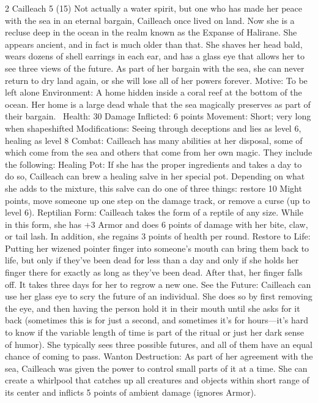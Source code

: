 \begin{multicols}{2}
Cailleach 5 (15)
Not actually a water spirit, but one who has made her peace with the sea in an eternal bargain, Cailleach once lived on land. Now she is a recluse deep in the ocean in the realm known as the Expanse of Halirane. She appears ancient, and in fact is much older than that. She shaves her head bald, wears dozens of shell earrings in each ear, and has a glass eye that allows her to see three views of the future. As part of her bargain with the sea, she can never return to dry land again, or she will lose all of her powers forever.
Motive: To be left alone
Environment: A home hidden inside a coral reef at the bottom of the ocean. Her home is a large dead whale that the sea magically preserves as part of their bargain. 
Health: 30
Damage Inflicted: 6 points
Movement: Short; very long when shapeshifted
Modifications: Seeing through deceptions and lies as level 6, healing as level 8
Combat: Cailleach has many abilities at her disposal, some of which come from the sea and
others that come from her own magic. They include the following:
Healing Pot: If she has the proper ingredients and takes a day to do so, Cailleach can brew a healing salve in her special pot. Depending on what she adds to the mixture, this salve can do one of three things: restore 10 Might points, move someone up one step on the damage track, or remove a curse (up to level 6).
Reptilian Form: Cailleach takes the form of a reptile of any size. While in this form, she has +3 Armor and does 6 points of damage with her bite, claw, or tail lash. In addition, she regains 3 points of health per round.
Restore to Life: Putting her wizened pointer finger into someone’s mouth can bring them back to life, but only if they’ve been dead for less than a day and only if she holds her finger there for exactly as long as they’ve been dead. After that, her finger falls off. It takes three days for her to regrow a new one.
See the Future: Cailleach can use her glass eye to scry the future of an individual. She does so by first removing the eye, and then having the person hold it in their mouth until she asks for it back (sometimes this is for just a second, and sometimes it’s for hours—it’s hard to know if the variable length of time is part of the ritual or just her dark sense of humor). She typically sees three possible futures, and all of them have an equal chance of coming to pass.
Wanton Destruction: As part of her agreement with the sea, Cailleach was given the power to control small parts of it at a time. She can create a whirlpool that catches up all creatures and objects within short range of its center and inflicts 5 points of ambient damage (ignores Armor).

\end{multicols}
